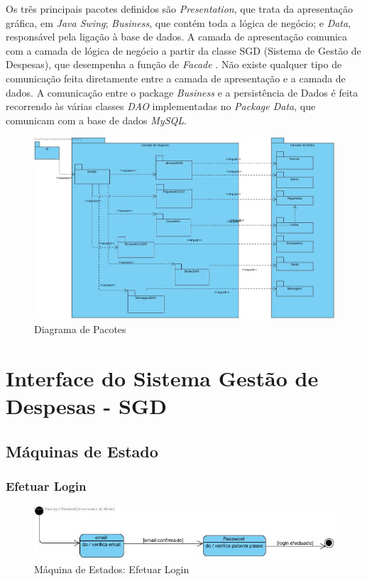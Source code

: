 \newpage

Os três principais pacotes definidos são \textit{Presentation}, que trata da apresentação gráfica, em \textit{Java Swing}; \textit{Business}, que contém toda a lógica de negócio; e \textit{Data}, responsável pela ligação à base de dados. A camada de apresentação comunica com a camada de lógica de negócio a partir da classe
SGD (Sistema de Gestão de Despesas), que desempenha a função de \textit{Facade} .
Não existe qualquer tipo de comunicação feita diretamente entre a camada de
apresentação e a camada de dados. A comunicação entre o package \textit{Business}
e a persistência de Dados é feita recorrendo às várias classes \textit{DAO} implementadas no \textit{Package Data}, que comunicam com a base de dados \textit{MySQL}.

\begin{figure}[htb!]
	\centering
	\includegraphics[scale=0.35]{imagens/DiagramInstalacao/PackageDiagram}  
	\caption{Diagrama de Pacotes}  
\end{figure}

\newpage

\chapter{Interface do Sistema Gestão de Despesas - SGD}
\section{Máquinas de Estado}
\subsection{Efetuar Login}

\begin{figure}[htb!]
	\centering
	\includegraphics[scale=0.7]{imagens/maqEstados/Login}  
	\caption{Máquina de Estados: Efetuar Login}  
\end{figure}


